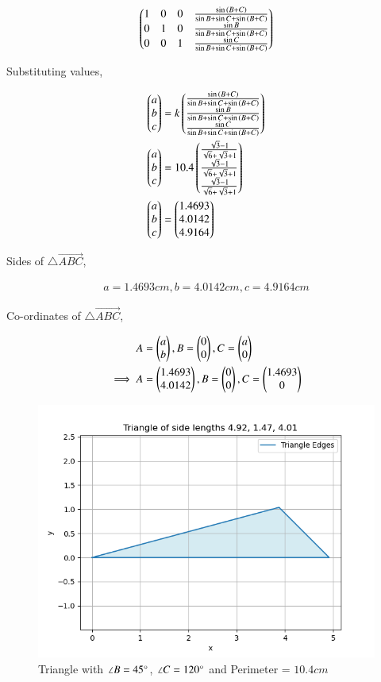 \documentclass[journal]{IEEEtran}
\begin{document}
\begin{align}
    \begin{pmatrix}1&0&0&\frac{\sin{\ensuremath{\left(B+C\right)}}}{\sin{B}+\sin{C}+\sin{\ensuremath{\left(B+C\right)}}}\\0&1&0&\frac{\sin{B}}{\sin{B}+\sin{C}+\sin{\ensuremath{\left(B+C\right)}}}\\0&0&1&\frac{\sin{C}}{\sin{B}+\sin{C}+\sin{\ensuremath{\left(B+C\right)}}}\end{pmatrix}
\end{align}

Substituting values,

\begin{align}
    \begin{pmatrix}a\\b\\c\end{pmatrix}&=k\begin{pmatrix}\frac{\sin{\ensuremath{\left(B+C\right)}}}{\sin{B}+\sin{C}+\sin{\ensuremath{\left(B+C\right)}}}\\\frac{\sin{B}}{\sin{B}+\sin{C}+\sin{\ensuremath{\left(B+C\right)}}}\\\frac{\sin{C}}{\sin{B}+\sin{C}+\sin{\ensuremath{\left(B+C\right)}}}\end{pmatrix} \\
    \begin{pmatrix}a\\b\\c\end{pmatrix}&=10.4\begin{pmatrix}\frac{\sqrt{3}-1}{\sqrt{6}+\sqrt{3}+1}\\\frac{\sqrt{3}-1}{\sqrt{6}+\sqrt{3}+1}\\\frac{\sqrt{3}-1}{\sqrt{6}+\sqrt{3}+1}\end{pmatrix} \\
    \begin{pmatrix}a\\b\\c\end{pmatrix}&=\begin{pmatrix}1.4693\\4.0142\\4.9164\end{pmatrix}
\end{align}

Sides of $\triangle\vec{ABC}$,

\begin{align}
    a=1.4693cm, b=4.0142cm, c=4.9164cm
\end{align}

Co-ordinates of $\triangle\vec{ABC}$,

\begin{align}
    A&=\begin{pmatrix}a\\b\end{pmatrix}, B=\begin{pmatrix}0\\0\end{pmatrix}, C=\begin{pmatrix}a\\0\end{pmatrix} \\
    \implies A&=\begin{pmatrix}1.4693\\4.0142\end{pmatrix}, B=\begin{pmatrix}0\\0\end{pmatrix}, C=\begin{pmatrix}1.4693\\0\end{pmatrix} 
\end{align}

\begin{figure}[h!]
	\centering
   	\includegraphics[width=0.7\linewidth]{figs/fig.png}
   	\caption{Triangle with $\angle B=45\degree$, $\angle C=120\degree$ and Perimeter = $10.4cm$}
    \label{Plot}
\end{figure}
\end{document}
